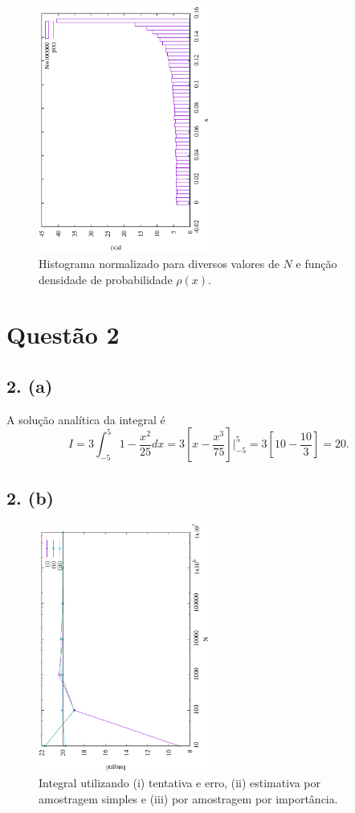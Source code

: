\documentclass[brazilian, 12pt, a4paper, final]{article}
\begin{document}
\begin{figure}[htbp]
  \centering
  \includegraphics[width=0.5\textwidth,angle=-90]{Q1/NormQ1d.eps}
  \caption{Histograma normalizado para diversos valores de $N$ e função densidade de probabilidade $\rho(x)$.}
  \label{fig:Q1d}
\end{figure}

\section*{Questão 2}
\subsection*{2. (a)}
A solução analítica da integral é
\begin{equation*}
	I=3\int_{-5}^{5} 1-\frac{x^2}{25} dx=3\left[x-\frac{x^3}{75}\right]\bigg\rvert_{-5}^{5}=3\left[10-\frac{10}{3}\right]=20.
\end{equation*}

\subsection*{2. (b)}
\begin{figure}[htbp]
  \centering
  \includegraphics[width=0.5\textwidth,angle=-90]{Q2/IQ2.eps}
  \caption{Integral utilizando (i) tentativa e erro, (ii) estimativa por amostragem simples e (iii) por amostragem por importância.}
\end{figure}
\end{document}
